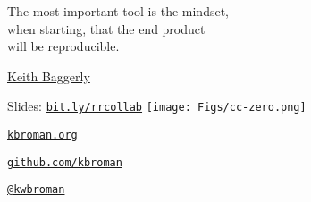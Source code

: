 \documentclass[aspectratio=169,12pt,t]{beamer}
\begin{document}
\begin{frame}[c]{}

\begin{center}
\large
The most important tool is the {\hilit mindset},\\
when starting, that the end product \\
will be reproducible.
\end{center}

\hfill
{\lolit
{\textendash} \href{https://odin.mdacc.tmc.edu/~kabaggerly/}{Keith Baggerly}
}

\end{frame}




\begin{frame}[c]{}

\Large

Slides: \href{https://bit.ly/rrcollab}{\tt bit.ly/rrcollab} \quad
\texttt{[image: Figs/cc-zero.png]}

\vspace{10mm}

\href{https://kbroman.org}{\tt kbroman.org}

\vspace{10mm}

\href{https://github.com/kbroman}{\tt github.com/kbroman}

\vspace{10mm}

\href{https://twitter.com/kwbroman}{\tt @kwbroman}


\end{frame}
\end{document}
